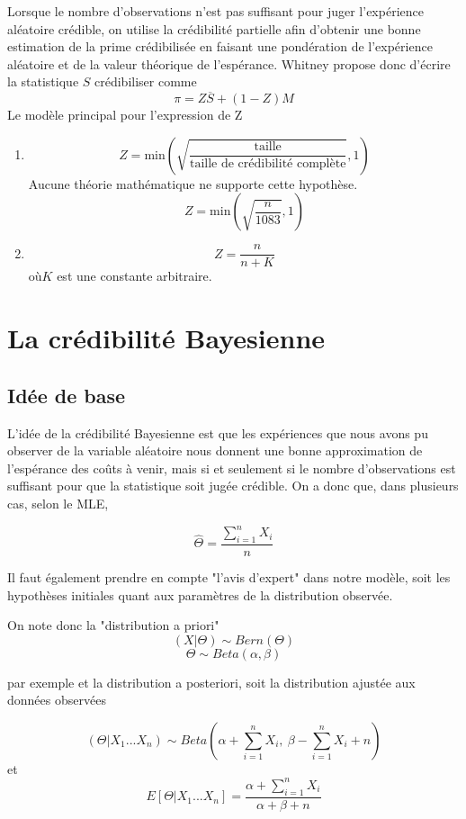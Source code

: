 \documentclass[11pt,french]{report}
\begin{document}
Lorsque le nombre d'observations n'est pas suffisant pour juger l'expérience aléatoire crédible, on utilise la crédibilité partielle afin d'obtenir une bonne estimation de la prime crédibilisée en faisant une pondération de l'expérience aléatoire et de la valeur théorique de l'espérance. Whitney propose donc d'écrire la statistique $S$ crédibiliser comme 
$$\pi = Z \overline{S}+(1-Z)M$$
Le modèle principal pour l'expression de Z
\begin{enumerate}
\item $$Z= \text{min} \left(\sqrt{\frac{\text{taille}}{\text{taille de crédibilité complète}}},1 \right)$$
    Aucune théorie mathématique ne supporte cette hypothèse.
    $$Z=\text{min} \left(\sqrt{\frac{n}{1083}},1 \right)$$

\item $$Z=\frac{n}{n+K}$$
  où$K$ est une constante arbitraire.
\end{enumerate}


\section{La crédibilité Bayesienne } 

\subsection{Idée de base}

L'idée de la crédibilité Bayesienne est que les expériences que nous avons pu observer de la variable aléatoire nous donnent une bonne approximation de l'espérance des coûts à venir, mais si et seulement si le nombre d'observations est suffisant pour que la statistique soit jugée crédible. On a donc que, dans plusieurs cas, selon le MLE, 

$$\widehat{\Theta} = \frac{\sum_{i=1}^{n} X_i}{n}$$

Il faut également prendre en compte "l'avis d'expert" dans notre modèle, soit les hypothèses initiales quant aux paramètres de la distribution observée.

On note donc la "distribution a priori"
$$(X|\Theta) \sim Bern(\Theta)$$
$$\Theta \sim Beta(\alpha, \beta)$$

par exemple et la distribution a posteriori, soit la distribution ajustée aux données observées

$$(\Theta|X_1 ... X_n) \sim Beta \left( \alpha + \sum_{i=1}^nX_i,\  \beta - \sum_{i=1}^nX_i +n \right)$$
et 
$$E[\Theta|X_1 ... X_n]=\frac{\alpha + \sum_{i=1}^nX_i}{\alpha + \beta + n}$$
\end{document}
